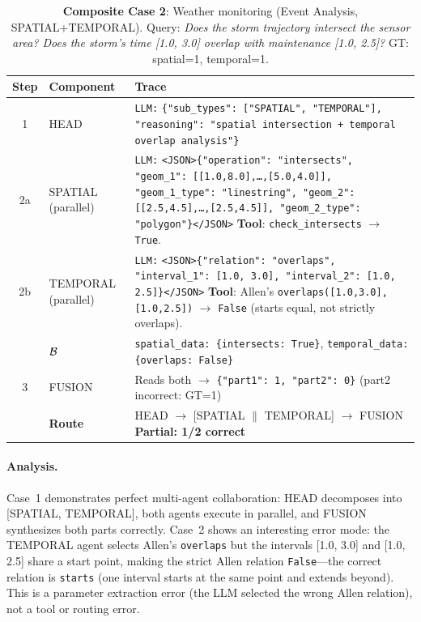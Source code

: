 \begin{table}[!htbp]
\centering
\caption{\textbf{Composite Case 2}: Weather monitoring (Event Analysis, SPATIAL+TEMPORAL).  Query: \textit{Does the storm trajectory intersect the sensor area? Does the storm's time [1.0, 3.0] overlap with maintenance [1.0, 2.5]?}  GT: spatial=1, temporal=1.}
\label{tab:comp_case2}
\small
\begin{tabular}{c l p{9.5cm}}
\toprule
Step & Component & Trace \\
\midrule
1 & HEAD &
\texttt{LLM:} \texttt{\{"sub\_types": ["SPATIAL", "TEMPORAL"], "reasoning": "spatial intersection + temporal overlap analysis"\}} \\
\midrule
2a & SPATIAL \newline (parallel) &
\texttt{LLM:} \texttt{<JSON>\{"operation": "intersects", "geom\_1": [[1.0,8.0],\ldots,[5.0,4.0]], "geom\_1\_type": "linestring", "geom\_2": [[2.5,4.5],\ldots,[2.5,4.5]], "geom\_2\_type": "polygon"\}</JSON>} \newline
\textbf{Tool}: \texttt{check\_intersects} $\to$ \texttt{True}. \\
\midrule
2b & TEMPORAL \newline (parallel) &
\texttt{LLM:} \texttt{<JSON>\{"relation": "overlaps", "interval\_1": [1.0, 3.0], "interval\_2": [1.0, 2.5]\}</JSON>} \newline
\textbf{Tool}: Allen's \texttt{overlaps([1.0,3.0], [1.0,2.5])} $\to$ \texttt{False} (starts equal, not strictly overlaps). \\
\midrule
& $\mathcal{B}$ &
\texttt{spatial\_data: \{intersects: True\}}, \texttt{temporal\_data: \{overlaps: False\}} \\
\midrule
3 & FUSION &
Reads both $\to$ \texttt{\{"part1": 1, "part2": 0\}} \hfill (part2 incorrect: GT=1) \\
\midrule
& \textbf{Route} & HEAD $\to$ [SPATIAL $\|$ TEMPORAL] $\to$ FUSION \hfill \textbf{Partial: 1/2 correct} \\
\bottomrule
\end{tabular}
\end{table}

\paragraph{Analysis.}
Case~1 demonstrates perfect multi-agent collaboration: HEAD decomposes into [SPATIAL, TEMPORAL], both agents execute in parallel, and FUSION synthesizes both parts correctly.
Case~2 shows an interesting error mode: the TEMPORAL agent selects Allen's \texttt{overlaps} but the intervals [1.0, 3.0] and [1.0, 2.5] share a start point, making the strict Allen relation \texttt{False}---the correct relation is \texttt{starts} (one interval starts at the same point and extends beyond).
This is a parameter extraction error (the LLM selected the wrong Allen relation), not a tool or routing error.

